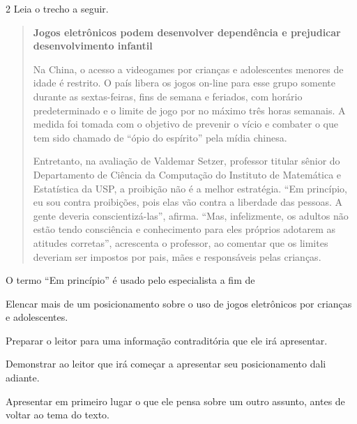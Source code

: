 \num{2} Leia o trecho a seguir.

\begin{quote}
\centering\textbf{Jogos eletrônicos podem desenvolver dependência e prejudicar
desenvolvimento infantil}\\
\medskip


\noindent Na China, o acesso a videogames por crianças e adolescentes menores de
idade é restrito. O país libera os jogos on-line para esse grupo somente
durante as sextas-feiras, fins de semana e feriados, com horário
predeterminado e o limite de jogo por no máximo três horas semanais. A
medida foi tomada com o objetivo de prevenir o vício e combater o que
tem sido chamado de ``ópio do espírito'' pela mídia chinesa.

Entretanto, na avaliação de Valdemar Setzer, professor titular sênior do
Departamento de Ciência da Computação do Instituto de Matemática e
Estatística da USP, a proibição não é a melhor estratégia. ``Em
princípio, eu sou contra proibições, pois elas vão contra a liberdade
das pessoas. A gente deveria conscientizá-las'', afirma. ``Mas,
infelizmente, os adultos não estão tendo consciência e conhecimento para
eles próprios adotarem as atitudes corretas'', acrescenta o professor,
ao comentar que os limites deveriam ser impostos por pais, mães e
responsáveis pelas crianças.

\end{quote}

\noindent O termo ``Em princípio'' é usado pelo especialista a fim de

\begin{escolha}
\item Elencar mais de um posicionamento sobre o uso de jogos eletrônicos
por crianças e adolescentes.
\item Preparar o leitor para uma informação contraditória que ele irá
apresentar.
\item Demonstrar ao leitor que irá começar a apresentar seu posicionamento
dali adiante.
\item Apresentar em primeiro lugar o que ele pensa sobre um outro assunto,
antes de voltar ao tema do texto.
\end{escolha}

